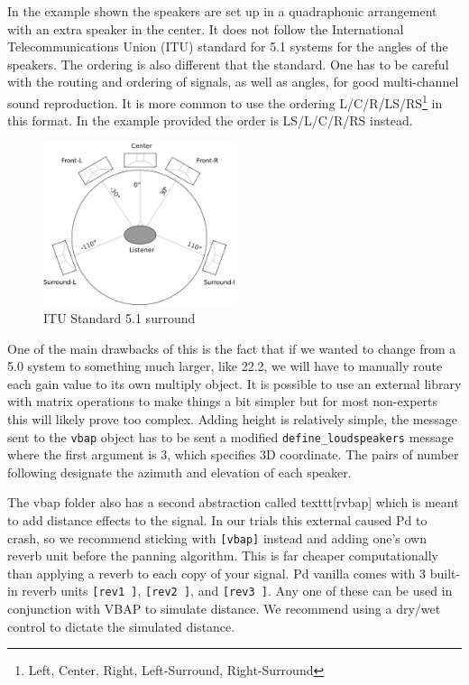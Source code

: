 In the example shown the speakers are set up in a quadraphonic arrangement with an extra speaker in the center. It does not follow the International Telecommunications Union (ITU) standard for 5.1 systems \cite{series2010multichannel} for the angles of the speakers. The ordering is also different that the standard. One has to be careful with the routing and ordering of signals, as well as angles, for good multi-channel sound reproduction. It is more common to use the ordering L/C/R/LS/RS\footnote{Left, Center, Right, Left-Surround, Right-Surround} in this format. In the example provided the order is LS/L/C/R/RS instead. 

\begin{figure}[ht!]%
\centering
\includegraphics[width=0.5\textwidth]{img/5-1-surr.png} 
\caption{ITU Standard 5.1 surround \cite{File51su81-online}}
\label{fig:5-1-itu}
\end{figure}


One of the main drawbacks of this is the fact that if we wanted to change from a 5.0 system to something much larger, like 22.2, we will have to manually route each gain value to its own multiply object. It is possible to use an external library with matrix operations to make things a bit simpler but for most non-experts this will likely prove too complex. Adding height is relatively simple, the message sent to the \texttt{vbap} object has to be sent a modified \texttt{define\_loudspeakers} message where the first argument is 3, which specifies 3D coordinate. The pairs of number following designate the azimuth and elevation of each speaker. 

The vbap folder also has a second abstraction called texttt{[rvbap]} which is meant to add distance effects to the signal. In our trials this external caused Pd to crash, so we recommend sticking with \texttt{[vbap]} instead and adding one's own reverb unit before the panning algorithm. This is far cheaper computationally than applying a reverb to each copy of your signal. Pd vanilla comes with 3 built-in reverb units \texttt{[rev1~]}, \texttt{[rev2~]}, and \texttt{[rev3~]}. Any one of these can be used in conjunction with VBAP to simulate distance. We recommend using a dry/wet control to dictate the simulated distance. 

